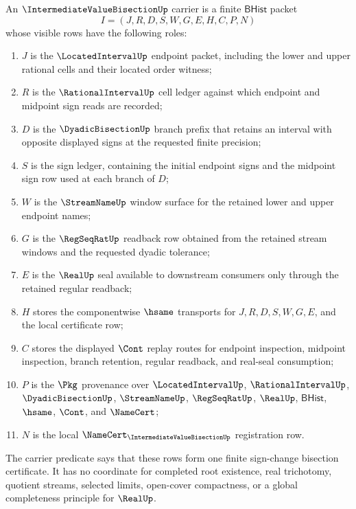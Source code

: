 \begin{theorem}
\label{thm:intermediate-value-bisection-carrier}
An $\IntermediateValueBisectionUp$ carrier is a finite $\mathsf{BHist}$ packet
$$
I=(J,R,D,S,W,G,E,H,C,P,N)
$$
whose visible rows have the following roles:
\begin{enumerate}
\item $J$ is the $\LocatedIntervalUp$ endpoint packet, including the lower and upper rational cells and their located order witness;
\item $R$ is the $\RationalIntervalUp$ cell ledger against which endpoint and midpoint sign reads are recorded;
\item $D$ is the $\DyadicBisectionUp$ branch prefix that retains an interval with opposite displayed signs at the requested finite precision;
\item $S$ is the sign ledger, containing the initial endpoint signs and the midpoint sign row used at each branch of $D$;
\item $W$ is the $\StreamNameUp$ window surface for the retained lower and upper endpoint names;
\item $G$ is the $\RegSeqRatUp$ readback row obtained from the retained stream windows and the requested dyadic tolerance;
\item $E$ is the $\RealUp$ seal available to downstream consumers only through the retained regular readback;
\item $H$ stores the componentwise $\hsame$ transports for $J,R,D,S,W,G,E$, and the local certificate row;
\item $C$ stores the displayed $\Cont$ replay routes for endpoint inspection, midpoint inspection, branch retention, regular readback, and real-seal consumption;
\item $P$ is the $\Pkg$ provenance over $\LocatedIntervalUp$, $\RationalIntervalUp$, $\DyadicBisectionUp$, $\StreamNameUp$, $\RegSeqRatUp$, $\RealUp$, $\mathsf{BHist}$, $\hsame$, $\Cont$, and $\NameCert$;
\item $N$ is the local $\NameCert_{\IntermediateValueBisectionUp}$ registration row.
\end{enumerate}
The carrier predicate says that these rows form one finite sign-change bisection certificate. It has no coordinate for completed root existence, real trichotomy, quotient streams, selected limits, open-cover compactness, or a global completeness principle for $\RealUp$.
\end{theorem}
